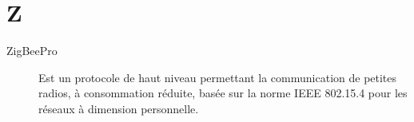 \section{Z}

\begin{description}

\item[ZigBeePro]
 Est un protocole de haut niveau permettant la communication de petites radios, à consommation réduite, basée sur la norme IEEE 802.15.4 pour les réseaux à dimension personnelle.

\end{description}